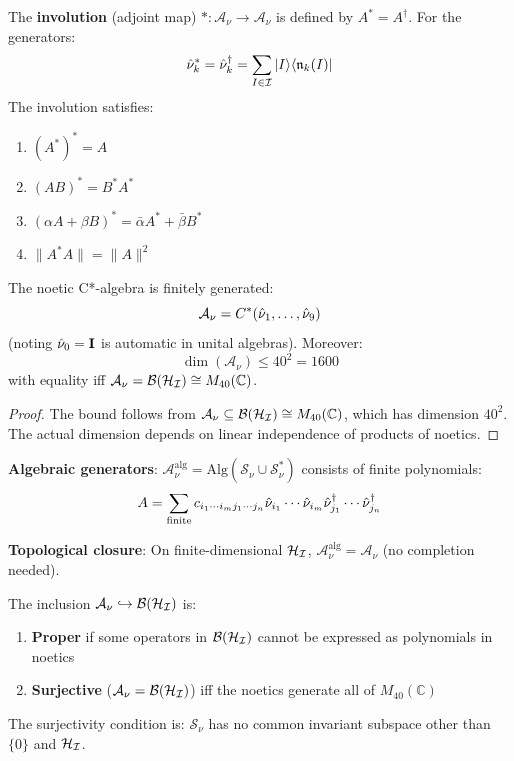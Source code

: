 \begin{definition}
\label{def:involution}
The \textbf{involution} (adjoint map) $* : \mathcal{A}_\nu \to \mathcal{A}_\nu$ is defined by $A^* = A^\dagger$. For the generators:
\[
\hat{\nu}_k^* = \hat{\nu}_k^\dagger = \sum_{I \in \mathcal{I}} |I\rangle\langle \mathfrak{n}_k(I)|
\]
The involution satisfies:
\begin{enumerate}
  \item $(A^*)^* = A$
  \item $(AB)^* = B^* A^*$
  \item $(\alpha A + \beta B)^* = \bar{\alpha} A^* + \bar{\beta} B^*$
  \item $\|A^* A\| = \|A\|^2$
\end{enumerate}
\end{definition}

\begin{theorem}
\label{thm:finite-generation}
The noetic C*-algebra is finitely generated:
\[
\mathcal{A}_\nu = C^*(\hat{\nu}_1, \ldots, \hat{\nu}_9)
\]
(noting $\hat{\nu}_0 = \mathbf{I}$ is automatic in unital algebras). Moreover:
\[
\dim(\mathcal{A}_\nu) \leq 40^2 = 1600
\]
with equality iff $\mathcal{A}_\nu = \mathcal{B}(\mathcal{H}_{\mathcal{I}}) \cong M_{40}(\mathbb{C})$.
\end{theorem}

\begin{proof}
The bound follows from $\mathcal{A}_\nu \subseteq \mathcal{B}(\mathcal{H}_{\mathcal{I}}) \cong M_{40}(\mathbb{C})$, which has dimension $40^2$. The actual dimension depends on linear independence of products of noetics.
\end{proof}

\begin{definition}
\label{def:generators}
\textbf{Algebraic generators}: $\mathcal{A}_\nu^{\mathrm{alg}} = \mathrm{Alg}(\mathcal{S}_\nu \cup \mathcal{S}_\nu^*)$ consists of finite polynomials:
\[
A = \sum_{\text{finite}} c_{i_1 \cdots i_m j_1 \cdots j_n} \hat{\nu}_{i_1} \cdots \hat{\nu}_{i_m} \hat{\nu}_{j_1}^\dagger \cdots \hat{\nu}_{j_n}^\dagger
\]

\textbf{Topological closure}: On finite-dimensional $\mathcal{H}_{\mathcal{I}}$, $\mathcal{A}_\nu^{\mathrm{alg}} = \mathcal{A}_\nu$ (no completion needed).
\end{definition}

\begin{proposition}
\label{prop:full-algebra-relation}
The inclusion $\mathcal{A}_\nu \hookrightarrow \mathcal{B}(\mathcal{H}_{\mathcal{I}})$ is:
\begin{enumerate}
  \item \textbf{Proper} if some operators in $\mathcal{B}(\mathcal{H}_{\mathcal{I}})$ cannot be expressed as polynomials in noetics
  \item \textbf{Surjective} ($\mathcal{A}_\nu = \mathcal{B}(\mathcal{H}_{\mathcal{I}})$) iff the noetics generate all of $M_{40}(\mathbb{C})$
\end{enumerate}
The surjectivity condition is: $\mathcal{S}_\nu$ has no common invariant subspace other than $\{0\}$ and $\mathcal{H}_{\mathcal{I}}$.
\end{proposition}

